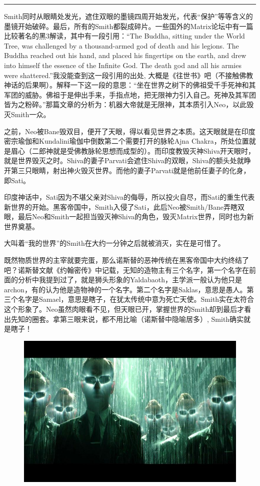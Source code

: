 \documentclass[UTF8]{ctexart}
\newcommand{\myparsep}{\noindent \rule[0.5ex]{\linewidth}{1pt}}
\begin{document}
\myparsep

Smith同时从眼睛处发光，遮住双眼的墨镜四周开始发光，代表“保护”等等含义的墨镜开始破碎。最后，所有的Smith都裂成碎片。一些国外的Matrix论坛中有一篇比较著名的黑3解读，其中有一段引用：“The Buddha, sitting under the World Tree, was challenged by a thousand-armed god of death and his legions. The Buddha reached out his hand, and placed his fingertips on the earth, and drew into himself the essence of the Infinite God. The death god and all his armies were shattered.”我没能查到这一段引用的出处, 大概是《往世书》吧（不接触佛教神话的后果啊）。解释一下这一段的意思：“坐在世界之树下的佛祖受千手死神和其军团的威胁。佛祖于是伸出手来，手指点地，把无限神力引入自己。死神及其军团皆为之粉碎。”那篇文章的分析为：机器大帝就是无限神，其本质引入Neo，以此毁灭Smith一众。

之前，Neo被Bane毁双目，便开了天眼，得以看见世界之本质。这天眼就是在印度密宗瑜伽和Kundalini瑜伽中倒数第二个需要打开的脉轮Ajna Chakra，所处位置就是眉心（二郎神就是受佛教脉轮思想而成型的）。而印度教毁灭神Shiva开天眼时，就是世界毁灭之时。Shiva的妻子Parvati会遮住Shiva的双眼，Shiva的额头处就睁开第三只眼睛，射出神火毁灭世界。而他的妻子Parvati就是他前任妻子的化身，即Sati。

印度神话中，Sati因为不堪父亲对Shiva的侮辱，所以投火自尽，而Sati的重生代表新世界的开始。黑客帝国中，Smith入侵了Sati，此后Neo被Smith/Bane弄瞎双眼，最后Neo和Smith一起担当毁灭神Shiva的角色，毁灭Matrix世界，同时也为新世界奠基。

大叫着“我的世界”的Smith在大约一分钟之后就被消灭，实在是可惜了。

既然物质世界的主宰就要完蛋，那么诺斯替的恶神传统在黑客帝国中大约终结了吧？诺斯替文献《约翰密传》中记载，无知的造物主有三个名字，第一个名字在前面的分析中我提到过了，就是狮头形象的Yaldabaoth，主学派一般认为他只是archon，有的认为他是造物神的一个名字。第二个名字是Saklas，意思是愚人。第三个名字是Samael，意思是瞎子，在犹太传统中意为死亡天使。Smith实在太符合这个形象了。Neo虽然肉眼看不见，但天眼已开，掌握世界的Smith却到最后才看出先知的圈套。拿第三眼来说，都不用比喻（诺斯替中隐喻居多）, Smith确实就是瞎子！

\begin{figure}[htb]
\centering
\includegraphics[width=0.5\linewidth]{fig/446bb2de5b4b855ccdbf1a54.jpg}
\end{figure}
\end{document}
